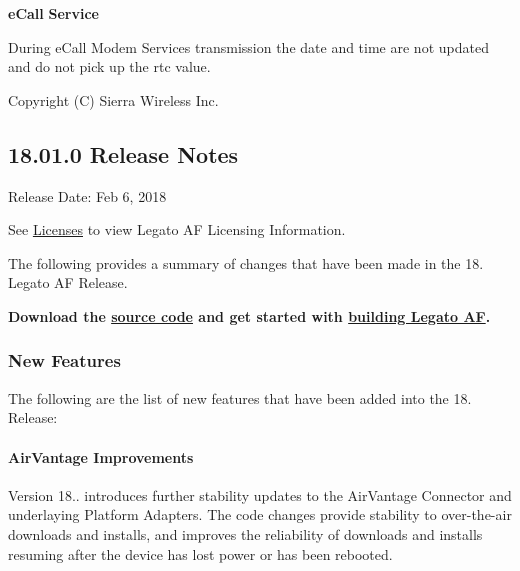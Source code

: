 {\bfseries e\+Call} {\bfseries Service} 
\begin{DoxyItemize}
\item During e\+Call Modem Services transmission the date and time are not updated and do not pick up the rtc value.
\end{DoxyItemize}

Copyright (C) Sierra Wireless Inc. \hypertarget{releaseNotes18010}{}\subsection{18.01.0 Release Notes}\label{releaseNotes18010}
Release Date\+: Feb 6, 2018

See \hyperlink{aboutLicenses}{Licenses} to view Legato AF Licensing Information.

The following provides a summary of changes that have been made in the 18. Legato AF Release.

{\bfseries  Download the \hyperlink{aboutReleaseInfo}{source code} and get started with \hyperlink{basicBuild}{building Legato AF}. }\hypertarget{releaseNotes18010_rn1801_Features}{}\subsubsection{New Features}\label{releaseNotes18010_rn1801_Features}
The following are the list of new features that have been added into the 18. Release\+:\hypertarget{releaseNotes18010_rn1801_Features_AV}{}\paragraph{Air\+Vantage Improvements}\label{releaseNotes18010_rn1801_Features_AV}
Version 18.. introduces further stability updates to the Air\+Vantage Connector and underlaying Platform Adapters. The code changes provide stability to over-\/the-\/air downloads and installs, and improves the reliability of downloads and installs resuming after the device has lost power or has been rebooted.

